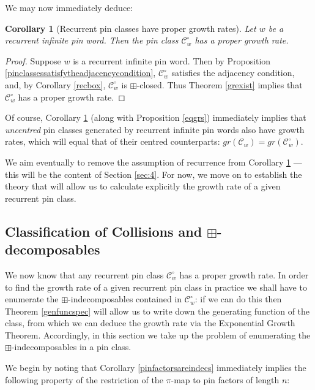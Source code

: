 \documentclass[11pt,a4paper]{article}
\newtheorem{cor}[thm]{Corollary}
\theoremstyle{definition}
\begin{document}
We may now immediately deduce:

\begin{cor}[Recurrent pin classes have proper growth rates] \label{recgrs}
Let $w$ be a recurrent infinite pin word. Then the pin class $\mathcal{C}^{\circ}_{w}$ has a proper growth rate.
\end{cor}

\begin{proof}
Suppose $w$ is a recurrent infinite pin word. Then by Proposition \ref{pinclassessatisfytheadjacencycondition}, $\mathcal{C}^{\circ}_{w}$ satisfies the adjacency condition, and, by Corollary \ref{recbox}, $\mathcal{C}^{\circ}_{w}$ is $\boxplus$-closed. Thus Theorem \ref{grexist} implies that $\mathcal{C}^{\circ}_{w}$ has a proper growth rate. \qedhere
\end{proof}

Of course, Corollary \ref{recgrs} (along with Proposition \ref{eqgrs}) immediately implies that \emph{uncentred} pin classes generated by recurrent infinite pin words also have growth rates, which will equal that of their centred counterparts: $gr(\mathcal{C}_{w}) = gr(\mathcal{C}^{\circ}_{w})$.

We aim eventually to remove the assumption of recurrence from Corollary \ref{recgrs} --- this will be the content of Section \ref{sec:4}. For now, we move on to establish the theory that will allow us to calculate explicitly the growth rate of a given recurrent pin class.

\subsection{Classification of Collisions and $\boxplus$-decomposables} \label{sec:3.5}

We now know that any recurrent pin class $\mathcal{C}^{\circ}_{w}$ has a proper growth rate. In order to find the growth rate of a given recurrent pin class in practice we shall have to enumerate the $\boxplus$-indecomposables contained in $\mathcal{C}^{\circ}_{w}$: if we can do this then Theorem \ref{genfuncspec} will allow us to write down the generating function of the class, from which we can deduce the growth rate via the Exponential Growth Theorem. Accordingly, in this section we take up the problem of enumerating the $\boxplus$-indecomposables in a pin class.

We begin by noting that Corollary \ref{pinfactorsareindecs} immediately implies the following property of the restriction of the $\pi$-map to pin factors of length $n$:
\end{document}
